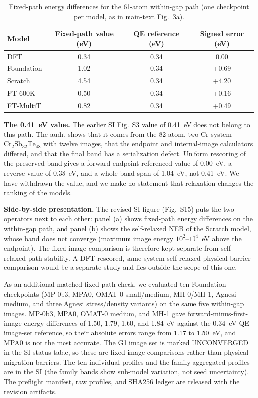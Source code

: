 \documentclass[11pt,a4paper]{article}
\begin{document}
\begin{table}[h]
\centering
\caption{Fixed-path energy differences for the 61-atom within-gap path (one checkpoint per model, as in main-text Fig.~3a).}
\begin{tabular}{lccc}
\toprule
Model & Fixed-path value (eV) & QE reference (eV) & Signed error (eV) \\
\midrule
DFT & 0.34 & 0.34 & 0.00 \\
Foundation & 1.02 & 0.34 & +0.69 \\
Scratch & 4.54 & 0.34 & +4.20 \\
FT-600K & 0.50 & 0.34 & +0.16 \\
FT-MultiT & 0.82 & 0.34 & +0.49 \\
\bottomrule
\end{tabular}
\end{table}

\textbf{The 0.41~eV value.} The earlier SI Fig.~S3 value of 0.41~eV does not belong to this path. The audit shows that it comes from the 82-atom, two-Cr system $\mathrm{Cr_2Sb_{32}Te_{48}}$ with twelve images, that the endpoint and internal-image calculators differed, and that the final band has a serialization defect. Uniform rescoring of the preserved band gives a forward endpoint-referenced value of 0.00~eV, a reverse value of 0.38~eV, and a whole-band span of 1.04~eV, not 0.41~eV. We have withdrawn the value, and we make no statement that relaxation changes the ranking of the models.

\textbf{Side-by-side presentation.} The revised SI figure (Fig.~S15) puts the two operators next to each other: panel (a) shows fixed-path energy differences on the within-gap path, and panel (b) shows the self-relaxed NEB of the Scratch model, whose band does not converge (maximum image energy $10^{2}$--$10^{4}$~eV above the endpoint). The fixed-image comparison is therefore kept separate from self-relaxed path stability. A DFT-rescored, same-system self-relaxed physical-barrier comparison would be a separate study and lies outside the scope of this one.

As an additional matched fixed-path check, we evaluated ten Foundation checkpoints (MP-0b3, MPA0, OMAT-0 small/medium, MH-0/MH-1, Agnesi medium, and three Agnesi stress/density variants) on the same five within-gap images. MP-0b3, MPA0, OMAT-0 medium, and MH-1 gave forward-minus-first-image energy differences of 1.50, 1.79, 1.60, and 1.84~eV against the 0.34~eV QE image-set reference, so their absolute errors range from 1.17 to 1.50~eV, and MPA0 is not the most accurate. The G1 image set is marked UNCONVERGED in the SI status table, so these are fixed-image comparisons rather than physical migration barriers. The ten individual profiles and the family-aggregated profiles are in the SI (the family bands show sub-model variation, not seed uncertainty). The preflight manifest, raw profiles, and SHA256 ledger are released with the revision artifacts.
\end{document}
